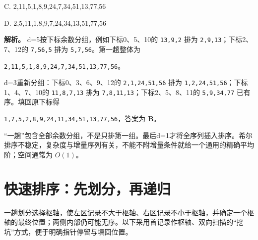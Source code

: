 C. 2,11,5,1,8,9,24,7,34,51,13,77,56

D. 2,5,11,1,8,9,7,24,34,13,51,77,56


\textbf{解析。} d=5按下标余数分组，例如下标0、5、10的 \texttt{13,}\allowbreak{}\texttt{9,}\allowbreak{}\texttt{2} 排为 \texttt{2,}\allowbreak{}\texttt{9,}\allowbreak{}\texttt{13}；下标2、7、12的 \texttt{7,}\allowbreak{}\texttt{56,}\allowbreak{}\texttt{5} 排为 \texttt{5,}\allowbreak{}\texttt{7,}\allowbreak{}\texttt{56}。第一趟整体为

\texttt{2,}\allowbreak{}\texttt{11,}\allowbreak{}\texttt{5,}\allowbreak{}\texttt{1,}\allowbreak{}\texttt{8,}\allowbreak{}\texttt{9,}\allowbreak{}\texttt{24,}\allowbreak{}\texttt{7,}\allowbreak{}\texttt{34,}\allowbreak{}\texttt{51,}\allowbreak{}\texttt{13,}\allowbreak{}\texttt{77,}\allowbreak{}\texttt{56}。

d=3重新分组：下标0、3、6、9、12的 \texttt{2,}\allowbreak{}\texttt{1,}\allowbreak{}\texttt{24,}\allowbreak{}\texttt{51,}\allowbreak{}\texttt{56} 排为 \texttt{1,}\allowbreak{}\texttt{2,}\allowbreak{}\texttt{24,}\allowbreak{}\texttt{51,}\allowbreak{}\texttt{56}；下标1、4、7、10的 \texttt{11,}\allowbreak{}\texttt{8,}\allowbreak{}\texttt{7,}\allowbreak{}\texttt{13} 排为 \texttt{7,}\allowbreak{}\texttt{8,}\allowbreak{}\texttt{11,}\allowbreak{}\texttt{13}；下标2、5、8、11的 \texttt{5,}\allowbreak{}\texttt{9,}\allowbreak{}\texttt{34,}\allowbreak{}\texttt{77} 已有序。填回原下标得

\texttt{1,}\allowbreak{}\texttt{7,}\allowbreak{}\texttt{5,}\allowbreak{}\texttt{2,}\allowbreak{}\texttt{8,}\allowbreak{}\texttt{9,}\allowbreak{}\texttt{24,}\allowbreak{}\texttt{11,}\allowbreak{}\texttt{34,}\allowbreak{}\texttt{51,}\allowbreak{}\texttt{13,}\allowbreak{}\texttt{77,}\allowbreak{}\texttt{56}，答案为 \textbf{B}。

``一趟''包含全部余数分组，不是只排第一组。最后d=1才将全序列插入排序。希尔排序不稳定，复杂度与增量序列有关，不能不附增量条件就给一个通用的精确平均阶；空间通常为 \(O(1)\)。

\section{快速排序：先划分，再递归}\label{ds-08-06}

一趟划分选择枢轴，使左区记录不大于枢轴、右区记录不小于枢轴，并确定一个枢轴的最终位置；两侧内部仍可能无序。以下采用首记录作枢轴、双向扫描的``挖坑''方式，便于明确指针停留与填回位置。

